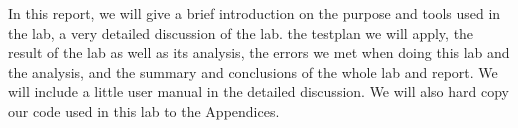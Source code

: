 In this report, we will give a brief introduction on the purpose and tools used in the lab, a very
detailed discussion of the lab. the testplan we will apply, the result of the lab as well as its analysis,
the errors we met when doing this lab and the analysis, and the summary and conclusions of the
whole lab and report. We will include a little user manual in the detailed discussion. We will also hard copy our code used in this lab to the Appendices.
